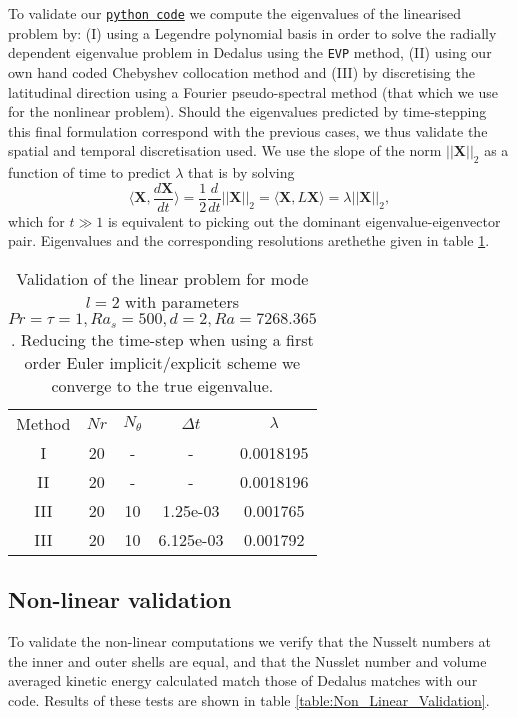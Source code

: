 \documentclass[a4paper]{article}
\newcommand{\Pran}{Pr}
\begin{document}
To validate our \href{https://github.com/mannixp/SpectralDoubleDiffusiveConvection.git}{\texttt{python code}} we compute the eigenvalues of the linearised problem by: (I) using a Legendre polynomial basis in order to solve the radially dependent eigenvalue problem in Dedalus \cite{burns2020dedalus} using the \texttt{EVP} method, (II) using our own hand coded Chebyshev collocation method and (III) by discretising the latitudinal direction using a Fourier pseudo-spectral method (that which we use for the nonlinear problem). Should the eigenvalues predicted by time-stepping this final formulation correspond with the previous cases, we thus validate the spatial and temporal discretisation used. We use the slope of the norm $||\boldsymbol{X}||_2$ as a function of time to predict $\lambda$ that is by solving 
\[   
\langle \boldsymbol{X}, \frac{d\boldsymbol{X}}{dt} \rangle  = \frac{1}{2} \frac{d}{dt} ||\boldsymbol{X}||_2 = \langle \boldsymbol{X}, L\boldsymbol{X} \rangle = \lambda ||\boldsymbol{X}||_2,
\]
which for $t \gg 1$ is equivalent to picking out the dominant eigenvalue-eigenvector pair. Eigenvalues and the corresponding resolutions arethethe given in table \ref{table:Linear_Validation}. 
\begin{table}[h!]
    \centering
    \begin{tabular}{ c | c | c|  c | c }
        \hline
        Method & $Nr$ & $N_{\theta}$ & $\Delta t$ & $\lambda$  \\
        I & 20 & - & - & 0.0018195 \\
        II & 20 & - & - & 0.0018196 \\
        III & 20 & 10 & 1.25e-03 & 0.001765 \\
        III & 20 & 10 & 6.125e-03 & 0.001792 \\
        \hline
    \end{tabular}
    \caption{Validation of the linear problem for mode $l =2$ with parameters $\Pran = \tau =1, Ra_s=500, d = 2, Ra = 7268.365$. Reducing the time-step when using a first order Euler implicit/explicit scheme we converge to the true eigenvalue.}
    \label{table:Linear_Validation}
\end{table}


\subsection{Non-linear validation}
To validate the non-linear computations we verify that the Nusselt numbers at the inner and outer shells are equal, and that the Nusslet number and volume averaged kinetic energy calculated match those of Dedalus \cite{burns2020dedalus} matches with our code. Results of these tests are shown in table \ref{table:Non_Linear_Validation}.
\end{document}
